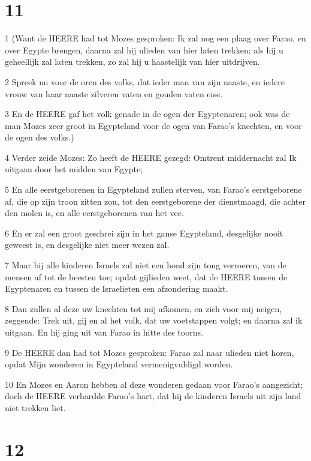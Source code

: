 \chapter{11}

\par 1 (Want de HEERE had tot Mozes gesproken: Ik zal nog een plaag over Farao, en over Egypte brengen, daarna zal hij ulieden van hier laten trekken; als hij u geheellijk zal laten trekken, zo zal hij u haastelijk van hier uitdrijven.
\par 2 Spreek nu voor de oren des volks, dat ieder man van zijn naaste, en iedere vrouw van haar naaste zilveren vaten en gouden vaten eise.
\par 3 En de HEERE gaf het volk genade in de ogen der Egyptenaren; ook was de man Mozes zeer groot in Egypteland voor de ogen van Farao's knechten, en voor de ogen des volks.)
\par 4 Verder zeide Mozes: Zo heeft de HEERE gezegd: Omtrent middernacht zal Ik uitgaan door het midden van Egypte;
\par 5 En alle eerstgeborenen in Egypteland zullen sterven, van Farao's eerstgeborene af, die op zijn troon zitten zou, tot den eerstgeborene der dienstmaagd, die achter den molen is, en alle eerstgeborenen van het vee.
\par 6 En er zal een groot geschrei zijn in het ganse Egypteland, desgelijke nooit geweest is, en desgelijke niet meer wezen zal.
\par 7 Maar bij alle kinderen Israels zal niet een hond zijn tong verroeren, van de mensen af tot de beesten toe; opdat gijlieden weet, dat de HEERE tussen de Egyptenaren en tussen de Israelieten een afzondering maakt.
\par 8 Dan zullen al deze uw knechten tot mij afkomen, en zich voor mij neigen, zeggende: Trek uit, gij en al het volk, dat uw voetstappen volgt; en daarna zal ik uitgaan. En hij ging uit van Farao in hitte des toorns.
\par 9 De HEERE dan had tot Mozes gesproken: Farao zal naar ulieden niet horen, opdat Mijn wonderen in Egypteland vermenigvuldigd worden.
\par 10 En Mozes en Aaron hebben al deze wonderen gedaan voor Farao's aangezicht; doch de HEERE verhardde Farao's hart, dat hij de kinderen Israels uit zijn land niet trekken liet.

\chapter{12}

